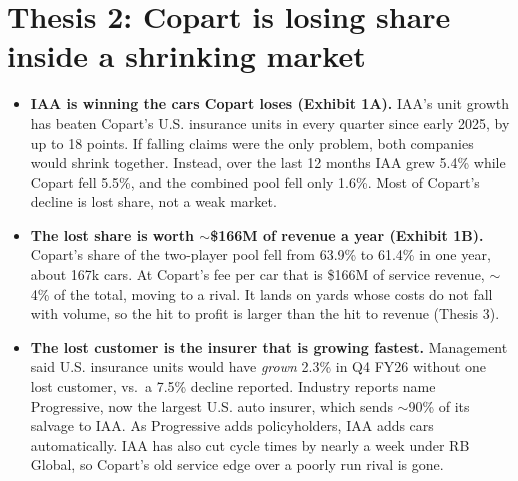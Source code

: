 \documentclass[10pt]{article}
\begin{document}
\section{Thesis 2: Copart is losing share inside a shrinking market}
\begin{itemize}
  \item \textbf{IAA is winning the cars Copart loses (Exhibit 1A).} IAA's unit growth has beaten Copart's U.S. insurance units in every quarter since early 2025, by up to 18 points. If falling claims were the only problem, both companies would shrink together. Instead, over the last 12 months IAA grew 5.4\% while Copart fell 5.5\%, and the combined pool fell only 1.6\%. Most of Copart's decline is lost share, not a weak market.
  \item \textbf{The lost share is worth $\sim$\$166M of revenue a year (Exhibit 1B).} Copart's share of the two-player pool fell from 63.9\% to 61.4\% in one year, about 167k cars. At Copart's fee per car that is \$166M of service revenue, $\sim$4\% of the total, moving to a rival. It lands on yards whose costs do not fall with volume, so the hit to profit is larger than the hit to revenue (Thesis 3).
  \item \textbf{The lost customer is the insurer that is growing fastest.} Management said U.S. insurance units would have \emph{grown} 2.3\% in Q4 FY26 without one lost customer, vs.\ a 7.5\% decline reported. Industry reports name Progressive, now the largest U.S. auto insurer, which sends $\sim$90\% of its salvage to IAA. As Progressive adds policyholders, IAA adds cars automatically. IAA has also cut cycle times by nearly a week under RB Global, so Copart's old service edge over a poorly run rival is gone.
\end{itemize}
\end{document}
